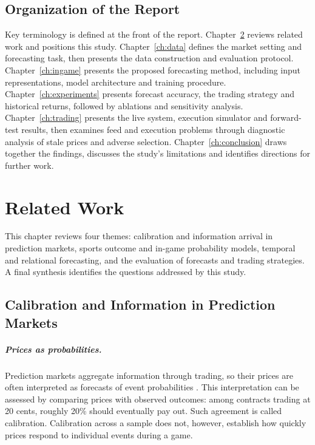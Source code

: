 \documentclass[12pt,a4paper,oneside]{report}
\begin{document}
\section{Organization of the Report}
Key terminology is defined at the front of the report.
Chapter~\ref{ch:background} reviews related work and positions this study.
Chapter~\ref{ch:data} defines the market setting and forecasting task, then
presents the data construction and evaluation protocol.
Chapter~\ref{ch:ingame} presents the proposed forecasting method, including
input representations, model architecture and training procedure.
Chapter~\ref{ch:experiments} presents forecast accuracy, the trading strategy and
historical returns, followed by ablations and sensitivity analysis.
Chapter~\ref{ch:trading} presents the live system, execution simulator and
forward-test results, then examines feed and execution problems through
diagnostic analysis of stale prices and adverse selection.
Chapter~\ref{ch:conclusion} draws together the findings, discusses the study's
limitations and identifies directions for further work.

\chapter{Related Work}
\label{ch:background}
This chapter reviews four themes: calibration and information arrival in
prediction markets, sports outcome and in-game probability models, temporal and
relational forecasting, and the evaluation of forecasts and trading strategies.
A final synthesis identifies the questions addressed by this study.

\section{Calibration and Information in Prediction Markets}\label{sec:efficiency}
\paragraph{Prices as probabilities.}
Prediction markets aggregate information through trading, so their prices are
often interpreted as forecasts of event probabilities
\citep{wolfers2004prediction,arrow2008promise}. This interpretation can be assessed
by comparing prices with observed outcomes: among contracts trading at 20 cents,
roughly 20\% should eventually pay out. Such agreement is called calibration.
Calibration across a sample does not, however, establish how quickly prices
respond to individual events during a game.
\end{document}
